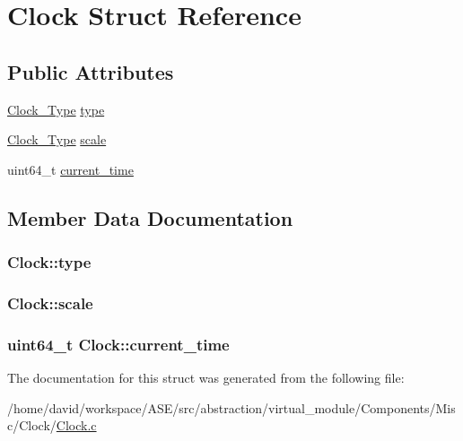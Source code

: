 \hypertarget{structClock}{
\section{Clock Struct Reference}
\label{structClock}
}
\subsection*{Public Attributes}
\begin{CompactItemize}
\item 
\hyperlink{Clock_8h_f30dd389b47b11d91ceabcecc30e4f13}{Clock\_\-Type} \hyperlink{structClock_b50790960d02b67fc146b34196315744}{type}
\item 
\hyperlink{Clock_8h_f30dd389b47b11d91ceabcecc30e4f13}{Clock\_\-Type} \hyperlink{structClock_bf613148bed10fc8b5bb58e9e0683946}{scale}
\item 
uint64\_\-t \hyperlink{structClock_01c8bc039c25a5cd6a9038aeffb95258}{current\_\-time}
\end{CompactItemize}


\subsection{Member Data Documentation}
\hypertarget{structClock_b50790960d02b67fc146b34196315744}{
\subsubsection{ {\bf Clock::type}}}
\label{structClock_b50790960d02b67fc146b34196315744}


\hypertarget{structClock_bf613148bed10fc8b5bb58e9e0683946}{
\subsubsection{ {\bf Clock::scale}}}
\label{structClock_bf613148bed10fc8b5bb58e9e0683946}


\hypertarget{structClock_01c8bc039c25a5cd6a9038aeffb95258}{
\subsubsection{\setlength{\rightskip}{0pt plus 5cm}uint64\_\-t {\bf Clock::current\_\-time}}}
\label{structClock_01c8bc039c25a5cd6a9038aeffb95258}




The documentation for this struct was generated from the following file:\begin{CompactItemize}
\item 
/home/david/workspace/ASE/src/abstraction/virtual\_\-module/Components/Misc/Clock/\hyperlink{Clock_8c}{Clock.c}\end{CompactItemize}
